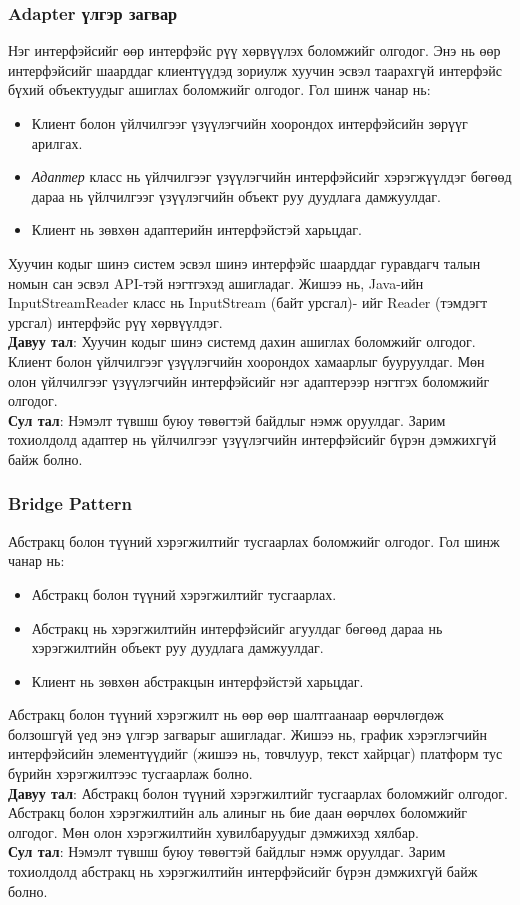 \subsubsection{Adapter үлгэр загвар}
\quad \quad Нэг интерфэйсийг өөр интерфэйс рүү хөрвүүлэх боломжийг олгодог. Энэ нь өөр интерфэйсийг шаарддаг клиентүүдэд зориулж хуучин эсвэл таарахгүй интерфэйс бүхий объектуудыг ашиглах боломжийг олгодог. Гол шинж чанар нь:
\begin{itemize}
	\item Клиент болон үйлчилгээг үзүүлэгчийн хоорондох интерфэйсийн зөрүүг арилгах.
	\item \textit{Адаптер} класс нь үйлчилгээг үзүүлэгчийн интерфэйсийг хэрэгжүүлдэг бөгөөд дараа нь үйлчилгээг үзүүлэгчийн объект руу дуудлага дамжуулдаг.
	\item Клиент нь зөвхөн адаптерийн интерфэйстэй харьцдаг.
\end{itemize}
Хуучин кодыг шинэ систем эсвэл шинэ интерфэйс шаарддаг гуравдагч талын номын сан эсвэл API-тэй нэгтгэхэд ашигладаг. Жишээ нь, Java-ийн InputStreamReader класс нь InputStream (байт урсгал)- ийг Reader (тэмдэгт урсгал) интерфэйс рүү хөрвүүлдэг.\\
\textbf{Давуу тал}: Хуучин кодыг шинэ системд дахин ашиглах боломжийг олгодог. Клиент болон үйлчилгээг үзүүлэгчийн хоорондох хамаарлыг бууруулдаг. Мөн олон үйлчилгээг үзүүлэгчийн интерфэйсийг нэг адаптерээр нэгтгэх боломжийг олгодог.\\
\textbf{Сул тал}: Нэмэлт түвшш буюу төвөгтэй байдлыг нэмж оруулдаг. Зарим тохиолдолд адаптер нь үйлчилгээг үзүүлэгчийн интерфэйсийг бүрэн дэмжихгүй байж болно.

\subsubsection{Bridge Pattern}
\quad \quad Абстракц болон түүний хэрэгжилтийг тусгаарлах боломжийг олгодог. Гол шинж чанар нь:
\begin{itemize}
	\item Абстракц болон түүний хэрэгжилтийг тусгаарлах.
	\item Абстракц нь хэрэгжилтийн интерфэйсийг агуулдаг бөгөөд дараа нь хэрэгжилтийн объект руу дуудлага дамжуулдаг.
	\item Клиент нь зөвхөн абстракцын интерфэйстэй харьцдаг.
\end{itemize}
Абстракц болон түүний хэрэгжилт нь өөр өөр шалтгаанаар өөрчлөгдөж болзошгүй үед энэ үлгэр загварыг ашигладаг. Жишээ нь, график хэрэглэгчийн интерфэйсийн элементүүдийг (жишээ нь, товчлуур, текст хайрцаг) платформ тус бүрийн хэрэгжилтээс тусгаарлаж болно.\\
\textbf{Давуу тал}: Абстракц болон түүний хэрэгжилтийг тусгаарлах боломжийг олгодог. Абстракц болон хэрэгжилтийн аль алиныг нь бие даан өөрчлөх боломжийг олгодог. Мөн олон хэрэгжилтийн хувилбаруудыг дэмжихэд хялбар.\\
\textbf{Сул тал}: Нэмэлт түвшш буюу төвөгтэй байдлыг нэмж оруулдаг. Зарим тохиолдолд абстракц нь хэрэгжилтийн интерфэйсийг бүрэн дэмжихгүй байж болно.	

